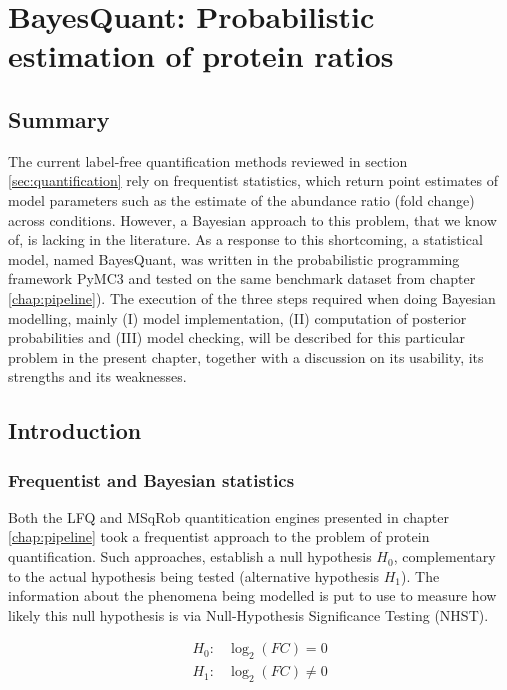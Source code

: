 \chapter{BayesQuant: Probabilistic estimation of protein ratios}
\label{chap:model}

\section*{Summary}

The current label-free quantification methods reviewed in section \ref{sec:quantification} rely on frequentist statistics, which return point estimates of model parameters such as the estimate of the abundance ratio (fold change) across conditions. However, a Bayesian  approach to this problem, that we know of, is lacking in the literature. As a response to this shortcoming, a statistical model, named BayesQuant, was written in the probabilistic programming framework PyMC3 and tested on the same benchmark dataset from chapter \ref{chap:pipeline}). The execution of the three steps required when doing Bayesian modelling, mainly (I) model implementation, (II) computation of posterior probabilities and (III) model checking, will be described for this particular problem in the present chapter, together with a discussion on its usability, its strengths and its weaknesses.

\section{Introduction}

\subsection{Frequentist and Bayesian statistics}

Both the LFQ and MSqRob quantitication engines presented in chapter \ref{chap:pipeline} took a frequentist approach to the problem of protein quantification. Such approaches, establish a null hypothesis $H_0$, complementary to the actual hypothesis being tested (alternative hypothesis $H_1$). The information about the phenomena being modelled is put to use to measure how likely this null hypothesis is via Null-Hypothesis Significance Testing (\ac{NHST}).


\begin{align}
H_0: & \log_2(FC) = 0 \nonumber \\
H_1: & \log_2(FC) \neq 0 \nonumber
\end{align}


